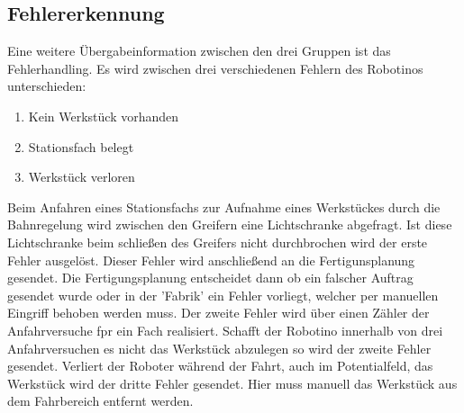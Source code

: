 \subsection{Fehlererkennung}
\label{Fehlererkennung}

Eine weitere Übergabeinformation zwischen den drei Gruppen ist das Fehlerhandling. Es wird zwischen drei verschiedenen Fehlern des Robotinos unterschieden:
\begin{enumerate}
\label{Fehlerliste}
\item Kein Werkstück vorhanden
\item Stationsfach belegt
\item Werkstück verloren
\end{enumerate}
\noindent
Beim Anfahren eines Stationsfachs zur Aufnahme eines Werkstückes durch die Bahnregelung wird zwischen den Greifern eine Lichtschranke abgefragt. Ist diese Lichtschranke beim schließen des Greifers nicht durchbrochen wird der erste Fehler ausgelöst. Dieser Fehler wird anschließend an die Fertigunsplanung gesendet. Die Fertigungsplanung entscheidet dann ob ein falscher Auftrag gesendet wurde oder in der 'Fabrik' ein Fehler vorliegt, welcher per manuellen Eingriff behoben werden muss. 
Der zweite Fehler wird über einen Zähler der Anfahrversuche fpr ein Fach realisiert. Schafft der Robotino innerhalb von drei Anfahrversuchen es nicht das Werkstück abzulegen so wird der zweite Fehler gesendet. 
Verliert der Roboter während der Fahrt, auch im Potentialfeld, das Werkstück wird der dritte Fehler gesendet. Hier muss manuell das Werkstück aus dem Fahrbereich entfernt werden.